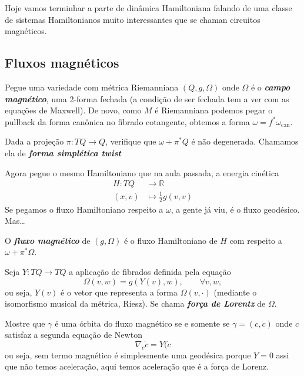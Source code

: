 Hoje vamos terminhar a parte de dinâmica Hamiltoniana falando de uma classe de sistemas Hamiltonianos muito interessantes que se chaman circuitos magnéticos.

\subsection{Fluxos magnéticos}

Pegue uma variedade com métrica Riemanniana $(Q,g,\Omega)$ onde $\Omega$ é o \textit{\textbf{campo magnético}}, uma 2-forma fechada {\color{3}(a condição de ser fechada tem a ver com as equações de Maxwell)}. De novo, como $M$ é Riemanniana podemos pegar o pullback da forma canônica no fibrado cotangente, obtemos a forma $\omega=f^*\omega_{\operatorname{can}}$.

\begin{exercise}\leavevmode
	Dada a projeção $\pi:TQ\to Q$, verifique que $\omega+\pi^*Q$ é não degenerada. Chamamos ela de \textit{\textbf{forma simplética twist}}
\end{exercise}

Agora pegue o mesmo Hamiltoniano que na aula passada, a energia cinética
\begin{align*}
	H: TQ &\longrightarrow \mathbb{R} \\
	(x,v) &\longmapsto \frac{1}{2}g(v,v)
\end{align*}
Se pegamos o fluxo Hamiltoniano respeito a $\omega$, a gente já viu, é o fluxo geodésico. Mas…
\begin{defn}\leavevmode
O \textit{\textbf{fluxo magnético}} de $(g,\Omega)$ é o fluxo Hamiltoniano de $H$ com respeito a $\omega+\pi^*\Omega$.	
\end{defn}

\begin{exercise}\leavevmode
	Seja $Y:TQ\to TQ$ a aplicação de fibrados definida pela equação
	\[\Omega(v,w)=g(Y(v),w),\qquad \forall v,w,\]
	ou seja, $Y(v)$ é o vetor que representa a forma $\Omega(v,\cdot)$ (mediante o isomorfismo musical da métrica, Riesz). Se chama \textit{\textbf{força de Lorentz}} de $\Omega$.

	Mostre que $\gamma$ é uma órbita do fluxo magnético se e somente se $\gamma=(c,\dot c)$ onde $c$ satisfaz a segunda equação de Newton
	\[\nabla_{\dot c}\dot c=Y(\dot c\]
	{\color{3}ou seja, sem termo magnético é simplesmente uma geodésica porque $Y=0$ assi que  não temos aceleração, aqui temos aceleração que é a força de Lorenz.}	
\end{exercise}

